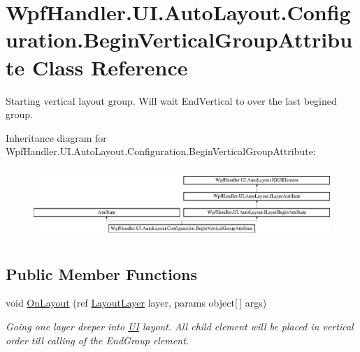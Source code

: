 \hypertarget{class_wpf_handler_1_1_u_i_1_1_auto_layout_1_1_configuration_1_1_begin_vertical_group_attribute}{}\section{Wpf\+Handler.\+U\+I.\+Auto\+Layout.\+Configuration.\+Begin\+Vertical\+Group\+Attribute Class Reference}
\label{class_wpf_handler_1_1_u_i_1_1_auto_layout_1_1_configuration_1_1_begin_vertical_group_attribute}


Starting vertical layout group. Will wait End\+Vertical to over the last begined group.  


Inheritance diagram for Wpf\+Handler.\+U\+I.\+Auto\+Layout.\+Configuration.\+Begin\+Vertical\+Group\+Attribute\+:\begin{figure}[H]
\begin{center}
\leavevmode
\includegraphics[height=2.718446cm]{de/db7/class_wpf_handler_1_1_u_i_1_1_auto_layout_1_1_configuration_1_1_begin_vertical_group_attribute}
\end{center}
\end{figure}
\subsection*{Public Member Functions}
\begin{DoxyCompactItemize}
\item 
void \mbox{\hyperlink{class_wpf_handler_1_1_u_i_1_1_auto_layout_1_1_configuration_1_1_begin_vertical_group_attribute_a52859bc4d83f107cbae35d20ae97ce83}{On\+Layout}} (ref \mbox{\hyperlink{class_wpf_handler_1_1_u_i_1_1_auto_layout_1_1_layout_layer}{Layout\+Layer}} layer, params object\mbox{[}$\,$\mbox{]} args)
\begin{DoxyCompactList}\small\item\em Going one layer deeper into \mbox{\hyperlink{namespace_wpf_handler_1_1_u_i}{UI}} layout. All child element will be placed in vertical order till calling of the End\+Group element. \end{DoxyCompactList}\end{DoxyCompactItemize}
